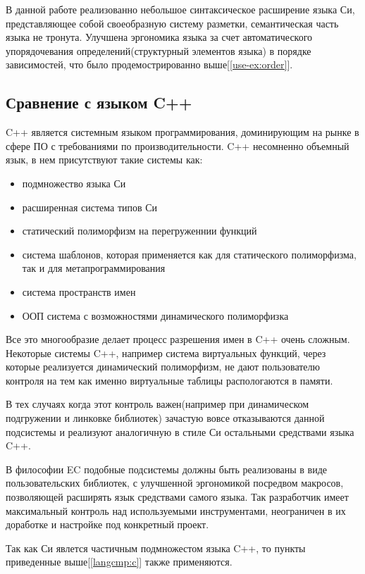 В данной работе реализованно небольшое синтаксическое расширение языка Си, представляющее собой своеобразную систему разметки, семантическая часть языка не тронута.
Улучшена эргономика языка за счет автоматического упорядочевания определений(структурный элементов языка) в порядке зависимостей, что было продемострированно выше[\ref{use-ex:order}].



\subsection{Сравнение с языком C++}
C++ является системным языком программирования, доминирующим на рынке в сфере ПО с требованиями по производительности. 
C++ несомненно объемный язык, в нем присутствуют такие системы как:
\begin{itemize}
\item подмножество языка Си
\item расширенная система типов Си
\item статический полиморфизм на перегруженнии функций
\item система шаблонов, которая применяется как для статического полиморфизма, так и для метапрограммирования
\item система пространств имен
\item ООП система с возможностями динамического полиморфизка
\end{itemize}

Все это многообразие делает процесс разрешения имен в C++ очень сложным. 
Некоторые системы C++, например система виртуальных функций, через которые реализуется динамический полиморфизм, 
не дают пользователю контроля на тем как именно виртуальные таблицы распологаются в памяти.

В тех случаях когда этот контроль важен(например при динамическом подгружении и линковке библиотек) зачастую вовсе отказываются данной подсистемы и реализуют аналогичную в стиле Си остальными средствами языка C++.

В философии EC подобные подсистемы должны быть реализованы в виде пользовательских библиотек, с улучшенной эргономикой посредвом макросов, позволяющей расширять язык средствами самого языка.
Так разработчик имеет максимальный контроль над используемыми инструментами, неограничен в их доработке и настройке под конкретный проект.

Так как Си явлется частичным подмножестом языка C++, то пункты приведенные выше[\ref{langcmp:c}] также применяются.

